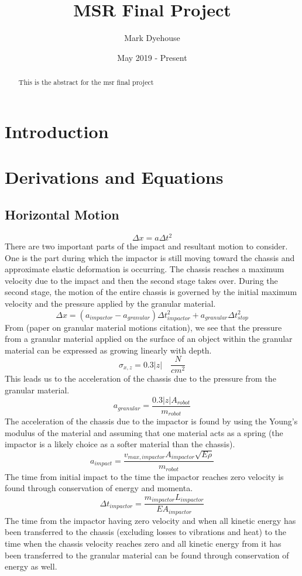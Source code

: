 \documentclass{article}
\title{MSR Final Project}
\author{Mark Dyehouse}
\date{May 2019 - Present}
\begin{document}
\maketitle

\begin{abstract}
    This is the abstract for the msr final project
\end{abstract}

\section{Introduction}

\section{Derivations and Equations}
\subsection{Horizontal Motion}
$$\Delta x = a \Delta t^2$$
There are two important parts of the impact and resultant motion to consider. One is the part during which the impactor is still moving toward the chassis and approximate elastic deformation is occurring. The chassis reaches a maximum velocity due to the impact and then the second stage takes over. During the second stage, the motion of the entire chassis is governed by the initial maximum velocity and the pressure applied by the granular material.
$$\Delta x = (a_{impactor} - a_{granular}) \Delta t^2_{impactor} + a_{granular} \Delta t_{stop}^2$$
From (paper on granular material motions citation), we see that the pressure from a granular material applied on the surface of an object within the granular material can be expressed as growing linearly with depth.
$$\sigma_{x,z} = 0.3 |z| \quad \dfrac{N}{cm^2}$$
This leads us to the acceleration of the chassis due to the pressure from the granular material.
$$a_{granular} = \dfrac{0.3 |z| A_{robot}}{m_{robot}}$$
The acceleration of the chassis due to the impactor is found by using the Young's modulus of the material and assuming that one material acts as a spring (the impactor is a likely choice as a softer material than the chassis).
$$a_{impact} = \dfrac{v_{max, impactor} A_{impactor} \sqrt{E \rho}}{m_{robot}}$$
The time from initial impact to the time the impactor reaches zero velocity is found through conservation of energy and momenta.
$$\Delta t_{impactor} = \dfrac{m_{impactor} L_{impactor}}{E A_{impactor}}$$
The time from the impactor having zero velocity and when all kinetic energy has been transferred to the chassis (excluding losses to vibrations and heat) to the time when the chassis velocity reaches zero and all kinetic energy from it has been transferred to the granular material can be found through conservation of energy as well.
\end{document}

